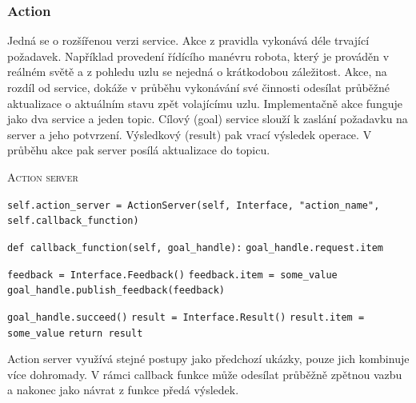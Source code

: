 \subsubsection*{Action} %
Jedná se o rozšířenou verzi service. Akce z pravidla vykonává déle trvající požadavek. Například provedení řídícího manévru robota, který je prováděn v reálném světě a z pohledu uzlu se nejedná o krátkodobou záležitost. Akce, na rozdíl od service, dokáže v průběhu vykonávání své činnosti odesílat průběžné aktualizace o aktuálním stavu zpět volajícímu uzlu. Implementačně akce funguje jako dva service a jeden topic. Cílový (goal) service slouží k zaslání požadavku na server a jeho potvrzení. Výsledkový (result) pak vrací výsledek operace. V průběhu akce pak server posílá aktualizace do topicu. \cite{ros2_introduction}
\newpage

\begin{algorithm}[h!]
	\label{}
	\caption{\textsc{Action server}}
	
	\DontPrintSemicolon
	\SetAlgoNoLine
	\SetNlSty{}{}{:}
	\SetNlSkip{-1.1em}
	
	\BlankLine \Indp\Indpp
	
	\texttt{self.action\_server = ActionServer(self, Interface, "action\_name", self.callback\_function)}\;
	
	\BlankLine
	\texttt{def callback\_function(self, goal\_handle):}\;
	\Indp\Indp
	\texttt{goal\_handle.request.item}\;
	
	\BlankLine
	\texttt{feedback = Interface.Feedback()}\;
	\texttt{feedback.item = some\_value}\;
	\texttt{goal\_handle.publish\_feedback(feedback)}\;
	
	\BlankLine
	\texttt{goal\_handle.succeed()}\;
	\texttt{result = Interface.Result()}\;
	\texttt{result.item = some\_value}\;
	\texttt{return result}\;
\end{algorithm}
Action server využívá stejné postupy jako předchozí ukázky, pouze jich kombinuje více dohromady. V rámci callback funkce může odesílat průběžně zpětnou vazbu a nakonec jako návrat z funkce předá výsledek. \cite{ros2_documentation}

